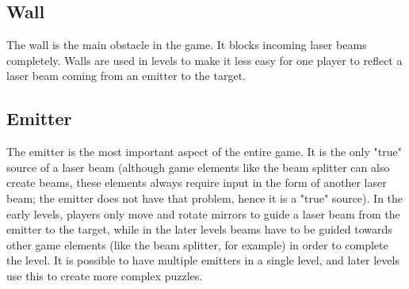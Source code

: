			\subsection{Wall}\label{ssec:wall}
			The wall is the main obstacle in the game. It blocks incoming
			laser beams completely. Walls are used in levels to make it 
			less easy for one player to reflect a laser beam coming from
			an emitter to the target.
			\subsection{Emitter}\label{ssec:emitter}
			The emitter is the most important aspect of the entire game.
			It is the only "true" source of a laser beam (although game
			elements like the beam splitter can also create beams, these
			elements always require input in the form of another laser
			beam; the emitter does not have that problem, hence it is a "true"
			source). In the early levels, players only move and rotate mirrors
			to guide a laser beam from the emitter to the target, while in the
			later levels beams have to be guided towards other game elements
			(like the beam splitter, for example) in order to complete the
			level. It is possible to have multiple emitters in a single level,
			and later levels use this to create more complex puzzles.
